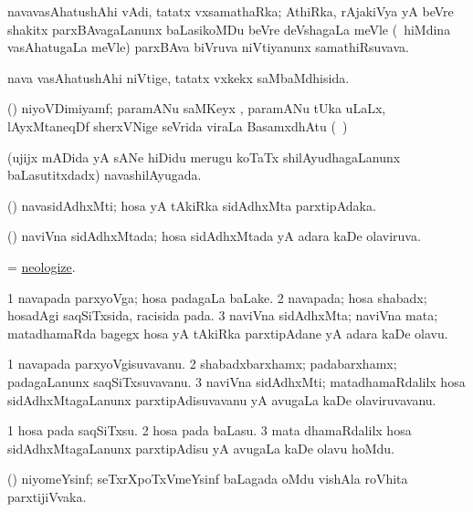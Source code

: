 \bentry
{}
\gl{\nA}
\bmng
navavasAhatushAhi vAdi, tatatx vxsamathaRka; AthiRka, rAjakiVya yA beVre shakitx parxBAvagaLanunx baLasikoMDu beVre deVshagaLa meVle (\kanmu\ hiMdina vasAhatugaLa meVle) parxBAva biVruva niVtiyanunx samathiRsuvava. 
\emng
\eentry

\bentry
{}
\gl{\gu}
\bmng
nava vasAhatushAhi niVtige, tatatx vxkekx saMbaMdhisida. 
\emng
\eentry

\bentry
{}
\gl{\nA}
\bmng
(\ravi) niyoVDimiyamf; paramANu saMKeyx , paramANu tUka  uLaLx, lAyxMtaneqDf sherxVNige seVrida viraLa BasamxdhAtu (\saMkeV\ ) 
\emng
\eentry

\bentry
{}
\gl{\gu}
\bmng
(ujijx mADida yA sANe hiDidu merugu koTaTx shilAyudhagaLanunx baLasutitxdadx) navashilAyugada. 
\emng
\eentry

\bentry
{}
\gl{\nA}
\bmng
(\deVva) navasidAdhxMti; hosa yA tAkiRka sidAdhxMta parxtipAdaka. 
\emng
\eentry

\bentry
{}
\gl{\gu}
\bmng
(\deVva) naviVna sidAdhxMtada; hosa sidAdhxMtada yA adara kaDe olaviruva. 
\emng
\eentry

\bentry
{}
\gl{\akirx}
\bmng
= \hyperlink{neologize}{neologize}. 
\emng
\eentry

\bentry
{}
\gl{\nA}
\bmng
\bnum
\num{1} navapada parxyoVga; hosa padagaLa baLake. 
\num{2} navapada; hosa shabadx; hosadAgi saqSiTxsida, racisida pada. 
\num{3} naviVna sidAdhxMta; naviVna mata; matadhamaRda bagegx hosa yA tAkiRka parxtipAdane yA adara kaDe olavu. 
\enum
\emng
\eentry

\bentry
{}
\gl{\nA}
\bmng
\bnum
\num{1} navapada parxyoVgisuvavanu. 
\num{2} shabadxbarxhamx; padabarxhamx; padagaLanunx saqSiTxsuvavanu. 
\num{3} naviVna sidAdhxMti; matadhamaRdalilx hosa sidAdhxMtagaLanunx parxtipAdisuvavanu yA avugaLa kaDe olaviruvavanu. 
\enum
\emng
\eentry

\bentry
{}
\gl{\akirx}
\bmng
\bnum
\num{1} hosa pada saqSiTxsu. 
\num{2} hosa pada baLasu. 
\num{3} mata dhamaRdalilx hosa sidAdhxMtagaLanunx parxtipAdisu yA avugaLa kaDe olavu hoMdu. 
\enum
\emng
\eentry

\bentry
{}
\gl{\nA}
\bmng
(\veYshA) niyomeYsinf; seTxrXpoTxVmeYsinf baLagada oMdu vishAla roVhita parxtijiVvaka. 
\emng
\eentry

